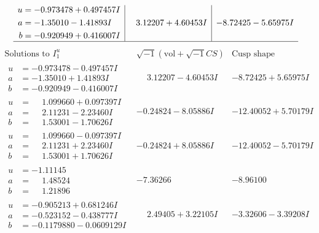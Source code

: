 \documentclass[1p]{elsarticle_modified}
\theoremstyle{definition}
\newcommand{\I}{\sqrt{-1}}
\begin{document}
$$\begin{array}{c|c|c}
\begin{aligned}
u &= -0.973478 + 0.497457 I \\
a &= -1.35010 - 1.41893 I \\
b &= -0.920949 + 0.416007 I\end{aligned}
 & \phantom{-}3.12207 + 4.60453 I & -8.72425 - 5.65975 I\\
 \hline 
 \end{array}$$\newpage$$\begin{array}{c|c|c}  
\text{Solutions to }I^u_{1}& \I (\text{vol} + \sqrt{-1}CS) & \text{Cusp shape}\\
 \hline 
\begin{aligned}
u &= -0.973478 - 0.497457 I \\
a &= -1.35010 + 1.41893 I \\
b &= -0.920949 - 0.416007 I\end{aligned}
 & \phantom{-}3.12207 - 4.60453 I & -8.72425 + 5.65975 I \\ \hline\begin{aligned}
u &= \phantom{-}1.099660 + 0.097397 I \\
a &= \phantom{-}2.11231 - 2.23460 I \\
b &= \phantom{-}1.53001 - 1.70626 I\end{aligned}
 & -0.24824 - 8.05886 I & -12.40052 + 5.70179 I \\ \hline\begin{aligned}
u &= \phantom{-}1.099660 - 0.097397 I \\
a &= \phantom{-}2.11231 + 2.23460 I \\
b &= \phantom{-}1.53001 + 1.70626 I\end{aligned}
 & -0.24824 + 8.05886 I & -12.40052 - 5.70179 I \\ \hline\begin{aligned}
u &= -1.11145\phantom{ +0.000000I} \\
a &= \phantom{-}1.48524\phantom{ +0.000000I} \\
b &= \phantom{-}1.21896\phantom{ +0.000000I}\end{aligned}
 & -7.36266\phantom{ +0.000000I} & -8.96100\phantom{ +0.000000I} \\ \hline\begin{aligned}
u &= -0.905213 + 0.681246 I \\
a &= -0.523152 - 0.438777 I \\
b &= -0.1179880 - 0.0609129 I\end{aligned}
 & \phantom{-}2.49405 + 3.22105 I & -3.32606 - 3.39208 I \\ \hline\begin{aligned}

\end{aligned}
\end{array}$$
\end{document}
